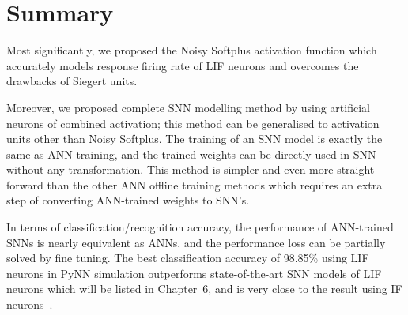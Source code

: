 \section{Summary}
	Most significantly, we proposed the Noisy Softplus activation function which accurately models response firing rate of LIF neurons and overcomes the drawbacks of Siegert units.
%		
%		
%		
%		

	Moreover, we proposed complete SNN modelling method by using artificial neurons of combined activation;
	this method can be generalised to activation units other than Noisy Softplus.
	The training of an SNN model is exactly the same as ANN training, and the trained weights can be directly used in SNN without any transformation.
	This method is simpler and even more straight-forward than the other ANN offline training methods which requires an extra step of converting ANN-trained weights to SNN's.
	
	In terms of classification/recognition accuracy, the performance of ANN-trained SNNs is nearly equivalent as ANNs, and the performance loss can  be partially solved by fine tuning.
	The best classification accuracy of 98.85\% using LIF neurons in PyNN simulation outperforms state-of-the-art SNN models of LIF neurons which will be listed in Chapter~6, and is very close to the result using IF neurons~\cite{diehl2015fast}. 
	

